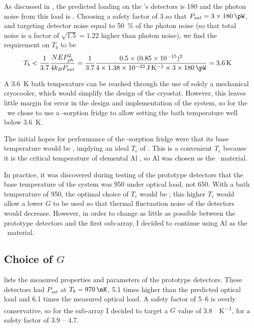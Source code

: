 As discussed in , the predicted loading on the \Imager's detectors is \SI{180}{\pW} and the photon noise from this load is .
Choosing a safety factor of 3 so that $P_{sat} = 3 \times \SI{180}{\pW}$, and targeting detector noise equal to \SI{50}{\percent} of the photon noise (so that total noise is a factor of $\sqrt{1.5} = 1.22$ higher than photon noise), we find the requirement on $T_b$ to be
\begin{equation}
  T_b < \frac{1}{3.7} \frac{\NEPph^2}{4 k_B P_{sat}} =
        \frac{1}{3.7} \frac{0.5 \times (\num{0.85e-15})^2}{4 \times \SI{1.38e-23}{\J\per\K} \times 3 \times \SI{180}{\pW}} = 
        \SI{3.6}{\K}
\end{equation}

A \SI{3.6}{\K} bath temperature can be reached through the use of solely a mechanical cryocooler, which would simplify the design of the cryostat.
However, this leaves little margin for error in the design and implementation of the system, so for the \Imager\ we chose to use a -sorption fridge to allow setting the bath temperature well below \SI{3.6}{\K}.

The initial hopes for performance of the -sorption fridge were that its base temperature would be , implying an ideal $T_c$ of .
This is a convenient $T_c$ because it is the critical temperature of elemental Al \cite{matthias_superconductivity_1963}, so Al was chosen as the \TES\ material.

In practice, it was discovered during testing of the prototype detectors that the base temperature of the system was \SI{950}{\mK} under optical load, not \SI{650}{\mK}.
With a bath temperature of \SI{950}{\mK}, the optimal choice of $T_c$ would be ; this higher $T_c$ would allow a lower $G$ to be used so that thermal fluctuation noise of the detectors would decrease.
However, in order to change as little as possible between the prototype detectors and the first sub-array, I decided to continue using Al as the \TES\ material.

\subsection{Choice of $G$}

 lists the measured properties and parameters of the prototype detectors.
These detectors had $P_{sat}$ at $T_b = \SI{970}{\mK}$, 5.1 times higher than the predicted optical load and 6.1 times the measured optical load.
A safety factor of 5--6 is overly conservative, so for the sub-array I decided to target a $G$ value of \SI{3.8}{\nW\per\K}, for a safety factor of 3.9 -- 4.7.

